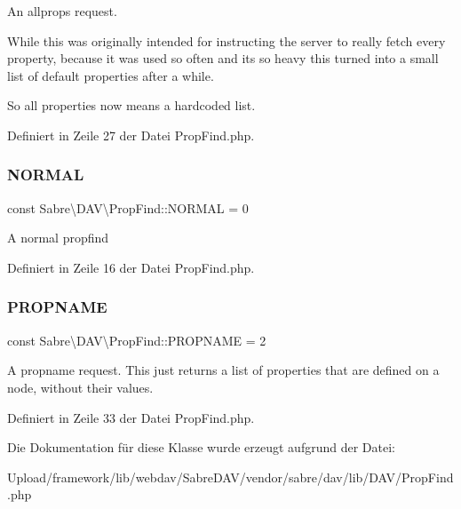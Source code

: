 An allprops request.

While this was originally intended for instructing the server to really fetch every property, because it was used so often and it\textquotesingle{}s so heavy this turned into a small list of default properties after a while.

So \textquotesingle{}all properties\textquotesingle{} now means a hardcoded list. 

Definiert in Zeile 27 der Datei Prop\+Find.\+php.

\mbox{\label{class_sabre_1_1_d_a_v_1_1_prop_find_a4a2799e72f47c5f9fe8b28abfb5d71db}} 
\subsubsection{\texorpdfstring{N\+O\+R\+M\+AL}{NORMAL}}
{\footnotesize\ttfamily const Sabre\textbackslash{}\+D\+A\+V\textbackslash{}\+Prop\+Find\+::\+N\+O\+R\+M\+AL = 0}

A normal propfind 

Definiert in Zeile 16 der Datei Prop\+Find.\+php.

\mbox{\label{class_sabre_1_1_d_a_v_1_1_prop_find_a1572cd88d1a8e57d522206896d75a400}} 
\subsubsection{\texorpdfstring{P\+R\+O\+P\+N\+A\+ME}{PROPNAME}}
{\footnotesize\ttfamily const Sabre\textbackslash{}\+D\+A\+V\textbackslash{}\+Prop\+Find\+::\+P\+R\+O\+P\+N\+A\+ME = 2}

A propname request. This just returns a list of properties that are defined on a node, without their values. 

Definiert in Zeile 33 der Datei Prop\+Find.\+php.



Die Dokumentation für diese Klasse wurde erzeugt aufgrund der Datei\+:\begin{DoxyCompactItemize}
\item 
Upload/framework/lib/webdav/\+Sabre\+D\+A\+V/vendor/sabre/dav/lib/\+D\+A\+V/Prop\+Find.\+php\end{DoxyCompactItemize}
